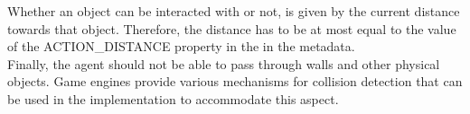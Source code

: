 Whether an object can be interacted with or not, is given by the current distance towards that object. Therefore, the distance has to be at most equal to the value of the ACTION\_DISTANCE property in the in the metadata.\\

Finally, the agent should not be able to pass through walls and other physical objects. Game engines provide various mechanisms for collision detection that can be used in the implementation to accommodate this aspect.\\
